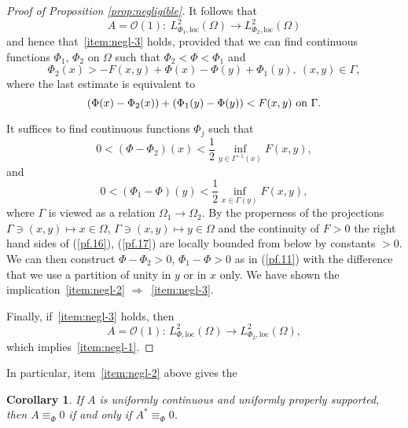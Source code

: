 \documentclass{article}
\newtheorem{coro}{Corollary}[theo]
\begin{document}
\begin{proof}[Proof of Proposition \ref{prop:negligible}]
  \par It follows that
  \begin{equation}\label{pf.13}
    A=\mathcal{ O}(1):\ L^2_{\Phi _1,\mathrm{loc}}(\Omega )\to L^2_{\Phi _2,\mathrm{loc}}(\Omega ) 
  \end{equation} 
  and hence that~\ref{item:negl-3} holds, provided that we can find
  continuous functions $\Phi _1$, $\Phi _2$ on $\Omega $ such that
  $\Phi _2<\Phi <\Phi _1$ and
  \begin{equation}\label{pf.14}
    \Phi _2(x)>-F(x,y)+\Phi (x)-\Phi (y)+\Phi _1(y),\ (x,y)\in \Gamma ,
  \end{equation}
  where the last estimate is equivalent to
  \begin{equation}\label{pf.15}
    (\Phi (x)-\Phi _2(x))+(\Phi _1(y)-\Phi (y))<F(x,y)\hbox{ on }\Gamma .
  \end{equation}

  \par It suffices to find continuous functions $\Phi _j$ such that
  \begin{equation}\label{pf.16}
    0<(\Phi -\Phi _2)(x)<\frac{1}{2}\inf_{y\in \Gamma ^{-1}(x)} F(x,y),
  \end{equation}
  and
  \begin{equation}\label{pf.17}
    0<(\Phi_1 -\Phi)(y)<\frac{1}{2}\inf_{x\in \Gamma (y)} F(x,y),
  \end{equation}
  where $\Gamma $ is viewed as a relation $\Omega _1\to \Omega _2$. By
  the properness of the projections
  $\Gamma \ni (x,y)\mapsto x\in \Omega $,
  $\Gamma \ni (x,y)\mapsto y\in \Omega $ and the continuity of $F>0$
  the right hand sides of (\ref{pf.16}), (\ref{pf.17}) are locally
  bounded from below by constants $>0$. We can then construct
  $\Phi -\Phi _2>0$, $\Phi _1-\Phi >0 $ as in (\ref{pf.11}) with the
  difference that we use a partition of unity in $y$ or in $x$
  only. We have shown the implication~\ref{item:negl-2}
  $\Rightarrow$~\ref{item:negl-3}.

  \par Finally, if~\ref{item:negl-3} holds, then
  \[
  A=\mathcal{ O}(1):\, L^2_{\Phi ,\mathrm{loc}}(\Omega )\to
  L^2_{\Phi_2 ,\mathrm{loc}}(\Omega ),
  \]
  which implies~\ref{item:negl-1}.
\end{proof}
In particular, item~\ref{item:negl-2} above gives the
\begin{coro}
  \label{coro:adjoint}
  If $A$ is uniformly continuous and uniformly properly supported,
  then $A\equiv_\Phi 0$ if and only if $A^*\equiv_\Phi 0$.
\end{coro}
\end{document}
